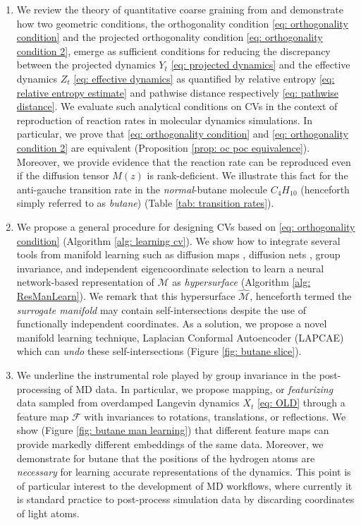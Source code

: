 \documentclass[reqno, 12pt]{article}
\begin{document}
\begin{enumerate}
    \item We review the theory of quantitative coarse graining from \cite{legoll2010effective, duong2018quantification, lelievre2019pathwise} and demonstrate how two geometric conditions, the orthogonality condition \eqref{eq: orthogonality condition} and the projected orthogonality condition \eqref{eq: orthogonality condition 2}, emerge as sufficient conditions for reducing the discrepancy between the projected dynamics $Y_t$ \eqref{eq: projected dynamics} and the effective dynamics $Z_t$ \eqref{eq: effective dynamics} as quantified by relative entropy \eqref{eq: relative entropy estimate} and pathwise distance respectively \eqref{eq: pathwise distance}. We evaluate such analytical conditions on CVs in the context of reproduction of reaction rates in molecular dynamics simulations. In particular, we prove that \eqref{eq: orthogonality condition} and \eqref{eq: orthogonality condition 2} are equivalent (Proposition \eqref{prop: oc poc equivalence}). Moreover, we provide evidence that the reaction rate can be reproduced even if the diffusion tensor $M(z)$ is rank-deficient. We illustrate this fact for the anti-gauche transition rate in the \emph{normal}-butane molecule $C_{4}H_{10}$ (henceforth simply referred to as \emph{butane}) (Table \eqref{tab: transition rates}). 
    \item We propose a general procedure for designing CVs based on \eqref{eq: orthogonality condition} (Algorithm \eqref{alg: learning cv}). We show how to integrate several tools from manifold learning such as diffusion maps \cite{coifman2008diffusion}, diffusion nets \cite{mishne2019diffusion}, group invariance, and independent eigencoordinate selection \cite{chen2019nonlinear} to learn a neural network-based representation of $\mathcal{M}$ as \emph{hypersurface} (Algorithm \eqref{alg: ResManLearn}). We remark that this hypersurface $\widehat{\mathcal{M}}$, henceforth termed the \emph{surrogate manifold} may contain self-intersections despite the use of functionally independent coordinates. As a solution, we propose a novel manifold learning technique, Laplacian Conformal Autoencoder (LAPCAE) which can \emph{undo} these self-intersections (Figure \eqref{fig: butane slice}).  
        \item We underline the instrumental role played by group invariance in the post-processing of MD data. In particular, we propose mapping, or \emph{featurizing} data sampled from overdamped Langevin dynamics $X_t$ \eqref{eq: OLD} through a feature map $\mathcal{F}$ with invariances to rotations, translations, or reflections. We show (Figure \ref{fig: butane man learning}) that different feature maps can provide markedly different embeddings of the same data. Moreover, we demonstrate for butane that the positions of the hydrogen atoms are \emph{necessary} for learning accurate representations of the dynamics. This point is of particular interest to the development of MD workflows, where currently it is standard practice to post-process simulation data by discarding coordinates of light atoms. 

\end{enumerate}
\end{document}
